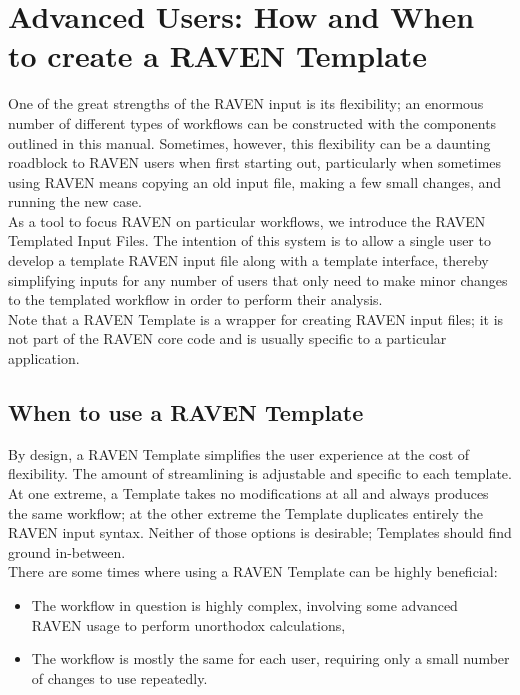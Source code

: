 \section{Advanced Users: How and When to create a RAVEN Template}
\label{sec:newTemplate}

One of the great strengths of the RAVEN input is its flexibility; an enormous number of different types of workflows can be constructed with the components outlined in this manual. Sometimes, however, this flexibility can be a daunting roadblock to RAVEN users when first starting out, particularly when sometimes using RAVEN means copying an old input file, making a few small changes, and running the new case.
\\

As a tool to focus RAVEN on particular workflows, we introduce the RAVEN Templated Input Files. The intention of this system is to allow a single user to develop a template RAVEN input file along with a template interface, thereby simplifying inputs for any number of users that only need to make minor changes to the templated workflow in order to perform their analysis.
\\

Note that a RAVEN Template is a wrapper for creating RAVEN input files; it is not part of the RAVEN core code and is usually specific to a particular application.

\subsection{When to use a RAVEN Template}
By design, a RAVEN Template simplifies the user experience at the cost of flexibility. The amount of streamlining is adjustable and specific to each template. At one extreme, a Template takes no modifications at all and always produces the same workflow; at the other extreme the Template duplicates entirely the RAVEN input syntax. Neither of those options is desirable; Templates should find ground in-between.
\\

There are some times where using a RAVEN Template can be highly beneficial:
\begin{itemize}
  \item The workflow in question is highly complex, involving some advanced RAVEN usage to perform unorthodox calculations,
  \item The workflow is mostly the same for each user, requiring only a small number of changes to use repeatedly.
\end{itemize}

